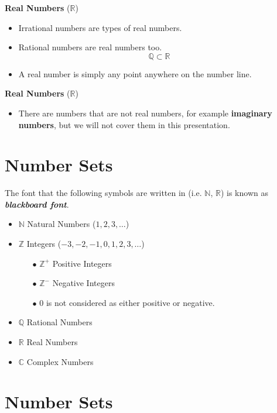 \documentclass[11pt,a4paper,titlepage,oneside,openany]{article}
\numberwithin{equation}{section}
\numberwithin{algorithm}{section}
\numberwithin{figure}{section}
\numberwithin{table}{section}
\begin{document}
{%
\textbf{Real Numbers} ($\mathbb{R}$)
\begin{itemize}
\item Irrational numbers are types of real numbers.
\item Rational numbers are real numbers too.
\[ \mathbb{Q}  \subset \mathbb{R}\]

\item A real number is simply any point anywhere on the number line.
\end{itemize}


\textbf{Real Numbers} ($\mathbb{R}$)
\begin{itemize}
\item There are numbers that are not real numbers, for example \textbf{imaginary numbers}, but we will not cover them in this presentation.
\end{itemize}

\section*{Number Sets}
The font that the following symbols are written in (i.e. $\mathbb{N}$, $\mathbb{R}$) is known as \textit{\textbf{blackboard font}}.
\begin{itemize}
\item $\mathbb{N}$ Natural Numbers ($1,2,3,\ldots$) 
\item $\mathbb{Z}$ Integers ($-3,-2,-1,0,1,2,3, \ldots$)
\begin{itemize}
\item[$\bullet$] $\mathbb{Z}^{+}$ Positive Integers
\item[$\bullet$] $\mathbb{Z}^{-}$ Negative Integers
\item[$\bullet$] 0 is not considered as either positive or negative.
\end{itemize}
\item $\mathbb{Q}$ Rational Numbers
\item $\mathbb{R}$ Real Numbers
\item $\mathbb{C}$ Complex Numbers
\end{itemize}





\section{Number Sets}

}
\end{document}
